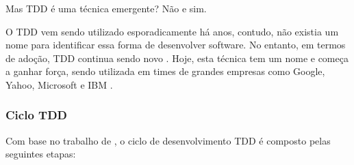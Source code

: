 Mas TDD é uma técnica emergente? Não e sim.

O TDD vem sendo utilizado esporadicamente há anos, contudo, não existia um nome para identificar essa forma de desenvolver software. No entanto, em termos de adoção, TDD continua sendo novo \cite{TestDrivenKoskela, TDDbyExample, EmpiricalTDD}. Hoje, esta técnica tem um nome e começa a ganhar força, sendo utilizada em times de grandes empresas como Google, Yahoo, Microsoft e IBM \cite{EmpiricalTDD}.

\subsubsection{Ciclo TDD}
\label{ssub:ciclo_tdd}

Com base no trabalho de , o ciclo de desenvolvimento TDD é composto pelas seguintes etapas:

